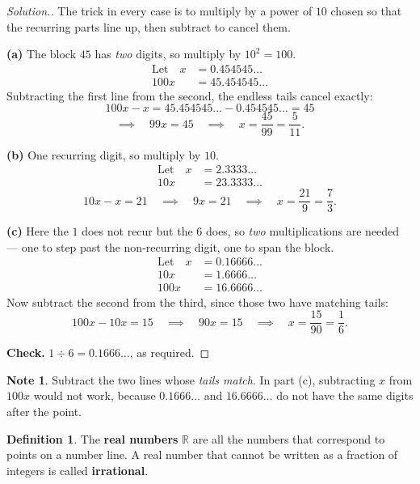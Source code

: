 \documentclass[11pt,a4paper]{article}
\theoremstyle{definition}
\newtheorem{definition}[thm]{Definition}
\newtheorem{note}[thm]{Note}
\newenvironment{solution}
  {\renewcommand{\qedsymbol}{}\begin{proof}[\textit{Solution}.]}
  {\end{proof}}
\begin{document}
\begin{solution}
The trick in every case is to multiply by a power of $10$ chosen so that the
recurring parts line up, then subtract to cancel them.

\textbf{(a)} The block $45$ has \emph{two} digits, so multiply by $10^2=100$.
\begin{align*}
\text{Let}\quad x &= 0.454545\ldots\\
100x &= 45.454545\ldots
\end{align*}
Subtracting the first line from the second, the endless tails cancel exactly:
$$100x-x=45.454545\ldots-0.454545\ldots=45$$
$$\implies\quad 99x=45\quad\implies\quad x=\frac{45}{99}=\frac{5}{11}.$$

\textbf{(b)} One recurring digit, so multiply by $10$.
\begin{align*}
\text{Let}\quad x &= 2.3333\ldots\\
10x &= 23.3333\ldots
\end{align*}
$$10x-x=21\quad\implies\quad 9x=21\quad\implies\quad x=\frac{21}{9}=\frac{7}{3}.$$

\textbf{(c)} Here the $1$ does not recur but the $6$ does, so \emph{two} multiplications
are needed --- one to step past the non-recurring digit, one to span the block.
\begin{align*}
\text{Let}\quad x &= 0.16666\ldots\\
10x &= 1.6666\ldots\\
100x &= 16.6666\ldots
\end{align*}
Now subtract the second from the third, since those two have matching tails:
$$100x-10x=15\quad\implies\quad 90x=15\quad\implies\quad x=\frac{15}{90}=\frac{1}{6}.$$

\textbf{Check.} $1\div 6=0.1666\ldots$, as required.
\end{solution}

\begin{note}
Subtract the two lines whose \emph{tails match}. In part (c), subtracting $x$ from
$100x$ would not work, because $0.1666\ldots$ and $16.6666\ldots$ do not have the same
digits after the point.
\end{note}

\begin{definition}
The \textbf{real numbers} $\mathbb{R}$ are all the numbers that correspond to points on
a number line. A real number that cannot be written as a fraction of integers is
called \textbf{irrational}.
\end{definition}
\end{document}
